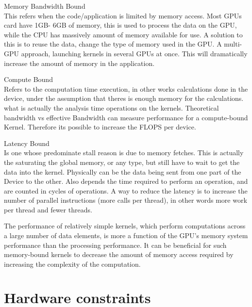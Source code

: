 \begin{description}

 \item{Memory Bandwidth Bound} \hfill \\
 This refers when the code/application is limited by memory access. Most GPUs card have 1GB- 6GB of memory, this is used to process the data on the GPU, while the CPU has massively amount of memory available for use. A solution to this is to reuse the data, change the type of memory used in the GPU. A multi-GPU approach, launching kernels in several GPUs at once. This will dramatically increase the amount of memory in the application.

  \item{Compute Bound} \hfill \\
Refers to the computation time execution, in other works calculations done in the device, under the assumption that  theres is enough memory for the calculations. what is actually the analysis time operations on the kernels. Theoretical bandwidth vs  effective Bandwidth can measure performance for a compute-bound Kernel. Therefore its possible to increase the FLOPS per device.

 \item{Latency Bound} \hfill \\
 Is one whose predominate stall reason is due to memory fetches. This is actually the saturating the global memory, or any type, but still have to wait to get the data into the kernel. Physically can be the data being sent from one part of the Device to the other. Also depends the time required to perform an operation, and are counted in cycles of operations. A way to reduce the latency is to increase the number of parallel instructions (more  calls per thread), in other words more work per thread and fewer threads.
 \end{description}

The performance of relatively simple kernels, which perform computations across a large number of data elements, is more a function of the GPU's memory system performance than the processing performance. It can be beneficial for such memory-bound kernels to decrease the amount of memory access required by increasing the complexity of the computation. \cite{cook}

\section{Hardware constraints}

